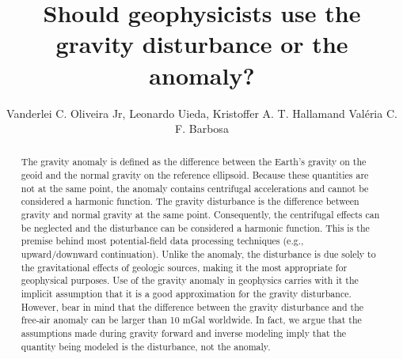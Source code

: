 \documentclass[manuscript]{geophysics}
\begin{document}
\title{Should geophysicists use the gravity disturbance or the anomaly?}

\renewcommand{\thefootnote}{\fnsymbol{footnote}} 


\address{
\footnotemark[1]Observat\'{o}rio Nacional, \\
Department of Geophysics, \\
Rio de Janeiro, Brazil \\
\footnotemark[2]University of Hawai'i at M\={a}noa, \\
Department of Geology and Geophysics, SOEST, \\
Honolulu, USA}
\author{Vanderlei C. Oliveira Jr\footnotemark[1], Leonardo Uieda\footnotemark[2],
Kristoffer A. T. Hallam\footnotemark[1] and Val\'{e}ria C. F. Barbosa\footnotemark[1]}


\maketitle

\begin{abstract}
  The gravity anomaly is defined as the difference between the Earth's gravity
 on the geoid and the normal gravity on the reference ellipsoid.
 Because these quantities are not at the same point, the anomaly contains
 centrifugal accelerations and cannot be considered a harmonic function.
 The gravity disturbance is the difference between gravity and normal gravity
 at the same point.
 Consequently, the centrifugal effects can be neglected and the disturbance can
 be considered a harmonic function.
 This is the premise behind most potential-field data processing techniques
 (e.g., upward/downward continuation).
 Unlike the anomaly, the disturbance is due solely to the
 gravitational effects of geologic sources, making it the most appropriate
 for geophysical purposes.
 Use of the gravity anomaly in geophysics carries with it the implicit
 assumption that it is a good approximation for the gravity disturbance.
 However, bear in mind that the difference between the gravity disturbance and
 the free-air anomaly can be larger than 10 mGal worldwide.
 In fact, we argue that the assumptions made during gravity forward and inverse
 modeling imply that the quantity being modeled is the disturbance, not the
 anomaly.
\end{abstract}
\end{document}
